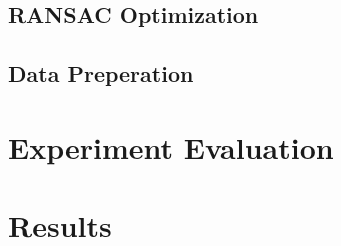 \documentclass[final]{cvpr}
\begin{document}
\subsection{RANSAC Optimization}

\subsection{Data Preperation}

\section{Experiment Evaluation}

\section{Results}


{\small


}
\end{document}
